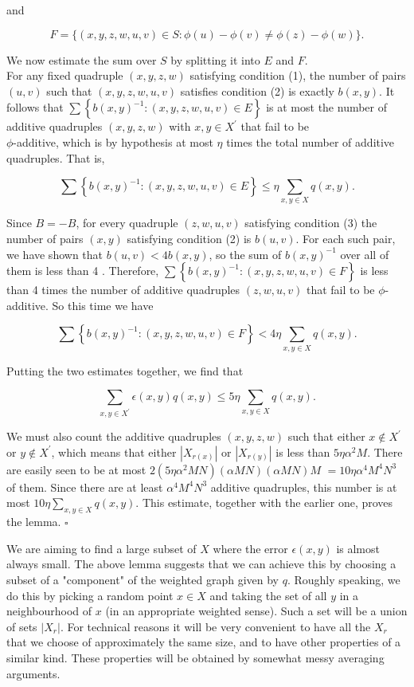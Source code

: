 \documentclass[10pt]{article}
\begin{document}
and

$$
F=\{(x, y, z, w, u, v) \in S: \phi(u)-\phi(v) \neq \phi(z)-\phi(w)\} .
$$

We now estimate the sum over $S$ by splitting it into $E$ and $F$.\\
For any fixed quadruple $(x, y, z, w)$ satisfying condition (1), the number of pairs $(u, v)$ such that $(x, y, z, w, u, v)$ satisfies condition (2) is exactly $b(x, y)$. It follows that $\sum\left\{b(x, y)^{-1}:(x, y, z, w, u, v) \in E\right\}$ is at most the number of additive quadruples $(x, y, z, w)$ with $x, y \in X^{\prime}$ that fail to be\\
$\phi$-additive, which is by hypothesis at most $\eta$ times the total number of additive quadruples. That is,

$$
\sum\left\{b(x, y)^{-1}:(x, y, z, w, u, v) \in E\right\} \leqslant \eta \sum_{x, y \in X} q(x, y) .
$$

Since $B=-B$, for every quadruple $(z, w, u, v)$ satisfying condition (3) the number of pairs $(x, y)$ satisfying condition (2) is $b(u, v)$. For each such pair, we have shown that $b(u, v)<4 b(x, y)$, so the sum of $b(x, y)^{-1}$ over all of them is less than 4 . Therefore, $\sum\left\{b(x, y)^{-1}:(x, y, z, w, u, v) \in F\right\}$ is less than 4 times the number of additive quadruples $(z, w, u, v)$ that fail to be $\phi$-additive. So this time we have

$$
\sum\left\{b(x, y)^{-1}:(x, y, z, w, u, v) \in F\right\}<4 \eta \sum_{x, y \in X} q(x, y) .
$$

Putting the two estimates together, we find that

$$
\sum_{x, y \in X^{\prime}} \epsilon(x, y) q(x, y) \leqslant 5 \eta \sum_{x, y \in X} q(x, y) .
$$

We must also count the additive quadruples $(x, y, z, w)$ such that either $x \notin X^{\prime}$ or $y \notin X^{\prime}$, which means that either $\left|X_{r(x)}\right|$ or $\left|X_{r(y)}\right|$ is less than $5 \eta \alpha^{2} M$. There are easily seen to be at most $2\left(5 \eta \alpha^{2} M N\right)(\alpha M N)(\alpha M N) M$ $=10 \eta \alpha^{4} M^{4} N^{3}$ of them. Since there are at least $\alpha^{4} M^{4} N^{3}$ additive quadruples, this number is at most $10 \eta \sum_{x, y \in X} q(x, y)$. This estimate, together with the earlier one, proves the lemma. \(\square\)

We are aiming to find a large subset of $X$ where the error $\epsilon(x, y)$ is almost always small. The above lemma suggests that we can achieve this by choosing a subset of a "component" of the weighted graph given by $q$. Roughly speaking, we do this by picking a random point $x \in X$ and taking the set of all $y$ in a neighbourhood of $x$ (in an appropriate weighted sense). Such a set will be a union of sets $\left|X_{r}\right|$. For technical reasons it will be very convenient to have all the $X_{r}$ that we choose of approximately the same size, and to have other properties of a similar kind. These properties will be obtained by somewhat messy averaging arguments.
\end{document}
